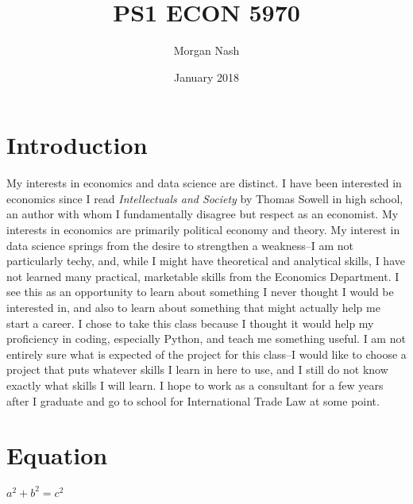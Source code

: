 \documentclass{article}
\title{PS1 ECON 5970}
\author{Morgan Nash}
\date{January 2018}
\begin{document}
\maketitle

\section{Introduction}
My interests in economics and data science are distinct. I have been interested in economics since I read \textit{Intellectuals and Society} by Thomas Sowell in high school, an author with whom I fundamentally disagree but respect as an economist. My interests in economics are primarily political economy and theory. My interest in data science springs from the desire to strengthen a weakness--I am not particularly techy, and, while I might have theoretical and analytical skills, I have not learned many practical, marketable skills from the Economics Department. I see this as an opportunity to learn about something I never thought I would be interested in, and also to learn about something that might actually help me start a career. I chose to take this class because I thought it would help my proficiency in coding, especially Python, and teach me something useful. I am not entirely sure what is expected of the project for this class--I would like to choose a project that puts whatever skills I learn in here to use, and I still do not know exactly what skills I will learn. I hope to work as a consultant for a few years after I graduate and go to school for International Trade Law at some point.




\section{Equation}
$ a^2 + b^2 = c^2 $
\end{document}
